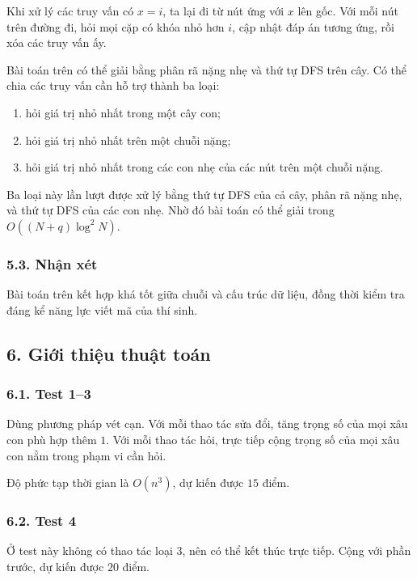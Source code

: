 \documentclass[11pt]{article}
\begin{document}
Khi xử lý các truy vấn có \(x=i\), ta lại đi từ nút ứng với \(x\) lên gốc. Với
mỗi nút trên đường đi, hỏi mọi cặp có khóa nhỏ hơn \(i\), cập nhật đáp án
tương ứng, rồi xóa các truy vấn ấy.

Bài toán trên có thể giải bằng phân rã nặng nhẹ và thứ tự DFS trên cây. Có thể
chia các truy vấn cần hỗ trợ thành ba loại:

\begin{enumerate}
  \item hỏi giá trị nhỏ nhất trong một cây con;
  \item hỏi giá trị nhỏ nhất trên một chuỗi nặng;
  \item hỏi giá trị nhỏ nhất trong các con nhẹ của các nút trên một chuỗi
  nặng.
\end{enumerate}

Ba loại này lần lượt được xử lý bằng thứ tự DFS của cả cây, phân rã nặng nhẹ,
và thứ tự DFS của các con nhẹ. Nhờ đó bài toán có thể giải trong
\(O((N+q)\log^2 N)\).

\subsubsection*{5.3. Nhận xét}

Bài toán trên kết hợp khá tốt giữa chuỗi và cấu trúc dữ liệu, đồng thời kiểm
tra đáng kể năng lực viết mã của thí sinh.

\subsection*{6. Giới thiệu thuật toán}

\subsubsection*{6.1. Test 1--3}

Dùng phương pháp vét cạn. Với mỗi thao tác sửa đổi, tăng trọng số của mọi xâu
con phù hợp thêm \(1\). Với mỗi thao tác hỏi, trực tiếp cộng trọng số của mọi
xâu con nằm trong phạm vi cần hỏi.

Độ phức tạp thời gian là \(O(n^3)\), dự kiến được \(15\) điểm.

\subsubsection*{6.2. Test 4}

Ở test này không có thao tác loại \(3\), nên có thể kết thúc trực tiếp. Cộng
với phần trước, dự kiến được \(20\) điểm.
\end{document}
